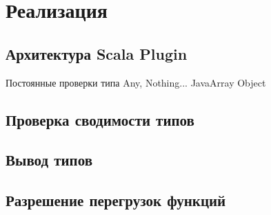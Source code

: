 \section{Реализация}

\subsection{Архитектура Scala Plugin}

Постоянные проверки типа Any, Nothing...
JavaArray
Object
\subsection{Проверка сводимости типов}
\subsection{Вывод типов}
\subsection{Разрешение перегрузок функций}

